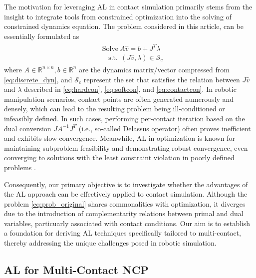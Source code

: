 \documentclass[lettersize,journal]{IEEEtran}
\begin{document}
The motivation for leveraging AL in contact simulation primarily stems from the insight to integrate tools from constrained optimization into the solving of constrained dynamics equation. 
The problem considered in this article, can be essentially formulated as 
\begin{align} \label{eq:prob_original}
\begin{split}
    &\text{Solve}~A\hat{v} = b + J^T\lambda \\
    &~~~~\text{s.t.}~~(J\hat{v},\lambda)\in \mathcal{S}_c
\end{split}
\end{align}
where $A\in\mathbb{R}^{n\times n}, b\in\mathbb{R}^n$ are the dynamics matrix/vector compressed from \eqref{eq:discrete_dyn}, and $\mathcal{S}_c$ represent the set that satisfies the relation between $J\hat{v}$ and $\lambda$ described in \eqref{eq:hardcon}, \eqref{eq:softcon}, and \eqref{eq:contactcon}. 
In robotic manipulation scenarios, contact points are often generated numerously and densely, which can lead to the resulting problem being ill-conditioned or infeasibly defined. 
In such cases, performing per-contact iteration based on the dual conversion $JA^{-1}J^T$ (i.e., so-called Delassus operator) often proves inefficient and exhibits slow convergence.
Meanwhile, AL in optimization is known for maintaining subproblem feasibility and demonstrating robust convergence, even converging to solutions with the least constraint violation in poorly defined problems \cite{dai2023augmented}.

Consequently, our primary objective is to investigate whether the advantages of the AL approach can be effectively applied to contact simulation. 
Although the problem \eqref{eq:prob_original} shares commonalities with optimization, it diverges due to the introduction of complementarity relations between primal and dual variables, particuarly associated with contact conditions. 
Our aim is to establish a foundation for deriving AL techniques specifically tailored to multi-contact, thereby addressing the unique challenges posed in robotic simulation.

\subsection{AL for Multi-Contact NCP} \label{subsec:AL_derivation}
\end{document}
